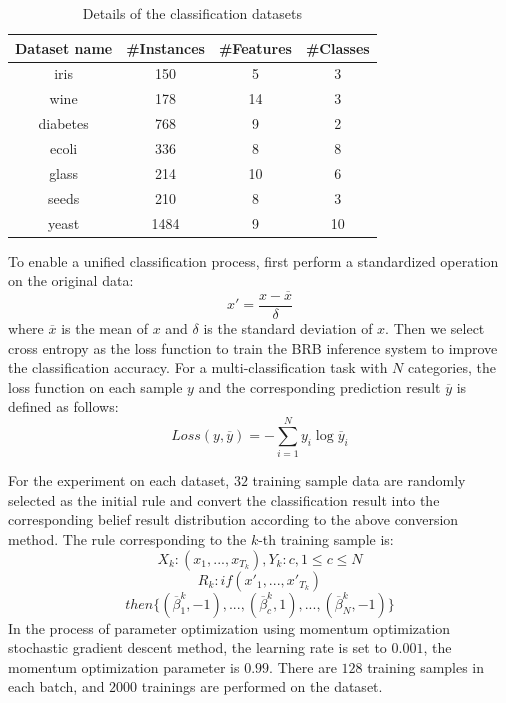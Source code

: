 \documentclass{ieeeaccess}
\begin{document}
\begin{table}
    \caption{Details of the classification datasets}
    \centering
    \label{tab4}
    \begin{tabular}{cccc}
        \hline
        Dataset name & \#Instances & \#Features & \#Classes \\
        \hline
        iris         & 150         & 5          & 3         \\
        wine         & 178         & 14         & 3         \\
        diabetes     & 768         & 9          & 2         \\
        ecoli        & 336         & 8          & 8         \\
        glass        & 214         & 10         & 6         \\
        seeds        & 210         & 8          & 3         \\
        yeast        & 1484        & 9          & 10        \\
        \hline
    \end{tabular}
\end{table}



To enable a unified classification process, first perform a standardized operation on the original data:
$$x'=\frac{x-\overline{x}}{\delta}$$
where $\overline{x}$ is the mean of $x$ and $\delta$ is the standard deviation of $x$.
Then we select cross entropy as the loss function to train the BRB inference system to improve the classification accuracy.
For a multi-classification task with $N$ categories, the loss function on each sample $y$ and the corresponding prediction result $\overline{y}$ is defined as follows:
$$Loss(y,\overline{y})=-\sum_{i=1}^Ny_{i}\log\overline{y}_i$$

For the experiment on each dataset, $32$ training sample data are randomly selected as the initial rule
and convert the classification result into the corresponding belief result distribution according to the above conversion method.
The rule corresponding to the $k$-th training sample is:
$$X_k:(x_1,...,x_{T_k}),Y_k:c,1\leq c\leq N$$
$$R_k:if(x'_1,...,x'_{T_k})$$
$$then\{(\overline{\beta}_1^k,-1),...,(\overline{\beta}_c^k,1),...,(\overline{\beta}_N^k,-1)\}$$
In the process of parameter optimization using momentum optimization stochastic gradient descent method,
the learning rate is set to $0.001$, the momentum optimization parameter is $0.99$.
There are $128$ training samples in each batch, and $2000$ trainings are performed on the dataset.
\end{document}
